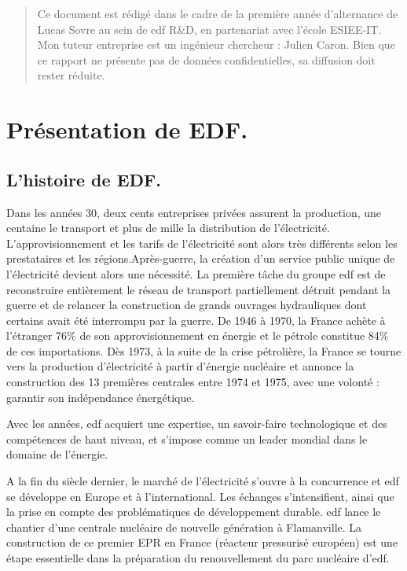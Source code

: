 \begin{abstract}
 Ce document est rédigé dans le cadre de la première année d'alternance de Lucas Sovre au sein de \acrshort{edf} R\&D, en partenariat avec l'école ESIEE-IT.
 Mon tuteur entreprise est un ingénieur chercheur : Julien Caron. Bien que ce rapport ne présente pas de données confidentielles, sa diffusion doit rester réduite.
\end{abstract}
\chapter{Présentation de EDF.}
\section{L'histoire de EDF.}
Dans les années 30, deux cents entreprises privées assurent la production, une centaine le transport et plus de mille la distribution de l’électricité. L’approvisionnement et les tarifs de l’électricité sont alors très différents selon les prestataires et les régions.Après-guerre, la création d’un service public unique de l’électricité devient alors une nécessité. La première tâche du groupe \acrshort{edf} est de reconstruire entièrement le réseau de transport partiellement détruit pendant la guerre et de relancer la construction de grands ouvrages hydrauliques dont certains avait été interrompu par la guerre. De 1946 à 1970, la France achète à l’étranger 76\% de son approvisionnement en énergie et le pétrole constitue 84\% de ces importations. Dès 1973, à la suite de la crise pétrolière, la France se tourne vers la production d’électricité à partir d’énergie nucléaire et annonce la construction des 13 premières centrales entre 1974 et 1975, avec une volonté : garantir son indépendance énergétique.

Avec les années, \gls{edf} acquiert une expertise, un savoir-faire technologique et des compétences de haut niveau, et s’impose comme un leader mondial dans le domaine de l’énergie.

A la fin du siècle dernier, le marché de l’électricité s’ouvre à la concurrence et \acrshort{edf} se développe en Europe et à l’international. Les échanges s’intensifient, ainsi que la prise en compte des problématiques de développement durable. \acrshort{edf} lance le chantier d’une centrale nucléaire de nouvelle génération à Flamanville. La construction de ce premier EPR en France (réacteur pressurisé européen) est une étape essentielle dans la préparation du renouvellement du parc nucléaire d’\acrshort{edf}.

